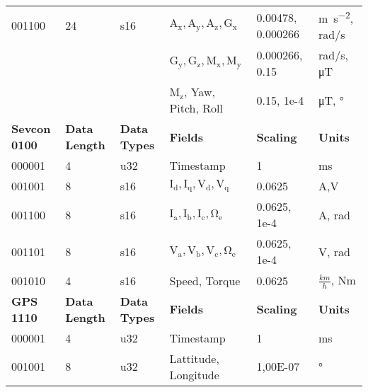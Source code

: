 \begin{table}[!b]
{\begin{minipage}{18cm}
\begin{tabular}{@{\makebox[3em][r]{\rownumber\space}}|llllll}
				001100               & 24                   & s16                 & $\mathrm{A_x, A_y, A_z, G_x}$            & 0.00478,  0.000266 & \si{\meter \per \second \squared}, rad/s        \\
				&                      &                     & $\mathrm{G_y, G_z, M_x, M_y}$              & 0.000266, 0.15     & rad/s, \si{\micro \tesla}                       \\
				&                      &                     & $\mathrm{M_z}$, Yaw, Pitch, Roll        & 0.15, 1e-4         & \si{\micro \tesla}, \si{\degree}                    \\
				\hline
				\textbf{Sevcon 0100} & \textbf{Data Length } & \textbf{Data Types} & \textbf{Fields}             & \textbf{Scaling}   & \textbf{Units}                                    \\
				\hline
				000001               & 4                    & u32                 & Timestamp                   & 1                  & ms                                                \\
				001001               & 8                    & s16                 & $\mathrm{I_d,I_q,V_d,V_q}$                & 0.0625             & A,V                                               \\
				001100               & 8                    & s16                 & $\mathrm{I_a, I_b, I_c, \Omega_e}$ & 0.0625, 1e-4       & A, rad                                            \\
				001101               & 8                    & s16                 & $\mathrm{V_a, V_b, V_c, \Omega_e}$ & 0.0625, 1e-4       & V, rad                                            \\
				001010               & 4                    & s16                 & Speed, Torque               & 0.0625             & $\frac{km}{h}$, Nm                              \\
				\hline
				\textbf{GPS 1110}    & \textbf{Data Length } & \textbf{Data Types} & \textbf{Fields}             & \textbf{Scaling}   & \textbf{Units}                                    \\
				\hline
				000001               & 4                    & u32                 & Timestamp                   & 1                  & ms                                                \\
				001001               & 8                    & u32                 & Lattitude, Longitude        & 1,00E-07           & \si{\degree} \\

\end{tabular}
\end{minipage}}
\end{table}
